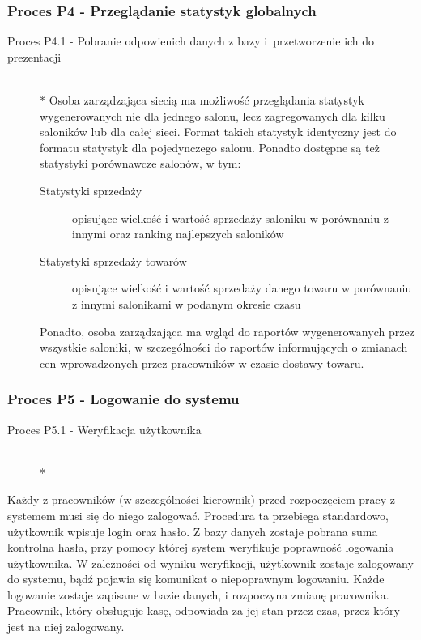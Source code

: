 \subsubsection{Proces P4 - Przeglądanie statystyk globalnych}
\begin{description}
\item[Proces P4.1 - Pobranie odpowienich danych z bazy i~przetworzenie ich do prezentacji] ~\\*
Osoba zarządzająca siecią ma możliwość przeglądania statystyk wygenerowanych nie dla jednego salonu, lecz zagregowanych dla kilku saloników lub dla całej sieci. Format takich statystyk identyczny jest do formatu statystyk dla pojedynczego salonu. Ponadto dostępne są też statystyki porównawcze salonów, w tym:
\begin{description}
\item[Statystyki sprzedaży] opisujące wielkość i wartość sprzedaży saloniku w porównaniu z innymi oraz ranking najlepszych saloników
\item[Statystyki sprzedaży towarów] opisujące wielkość i wartość sprzedaży danego towaru w porównaniu z innymi salonikami w podanym okresie czasu
\end{description}
Ponadto, osoba zarządzająca ma wgląd do raportów wygenerowanych przez wszystkie saloniki, w szczególności do raportów informujących o zmianach cen wprowadzonych przez pracowników w czasie dostawy towaru.
\end{description}
\subsubsection{Proces P5 - Logowanie do systemu}
\begin{description}
\item[Proces P5.1 - Weryfikacja użytkownika] ~\\*
\end{description}
Każdy z pracowników (w szczególności kierownik) przed rozpoczęciem pracy z systemem musi się do niego zalogować. Procedura ta przebiega standardowo, użytkownik wpisuje login oraz hasło. Z bazy danych zostaje pobrana suma kontrolna hasła, przy pomocy której system weryfikuje poprawność logowania użytkownika. W zależności od wyniku weryfikacji, użytkownik zostaje zalogowany do systemu, bądź pojawia się komunikat o niepoprawnym logowaniu. Każde logowanie zostaje zapisane w bazie danych, i rozpoczyna zmianę pracownika. Pracownik, który obsługuje kasę, odpowiada za jej stan przez czas, przez który jest na niej zalogowany.
